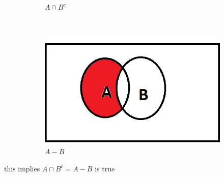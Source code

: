 \documentclass[a4paper,11pt]{report}
\begin{document}
\begin{figure}[h]
\begin{subfigure}[b]{0.25\textwidth}
        \caption{$A \cap B^c$}
    \end{subfigure}
 ~
    \begin{subfigure}[b]{0.25\textwidth}
        \includegraphics[width=\textwidth]{A-B}
        \caption{$A-B$}
        \label{fig:mouse}
    \end{subfigure}
    \caption{}

\end{figure}
this implies $A \cap B^c = A-B$ is true
\end{document}
